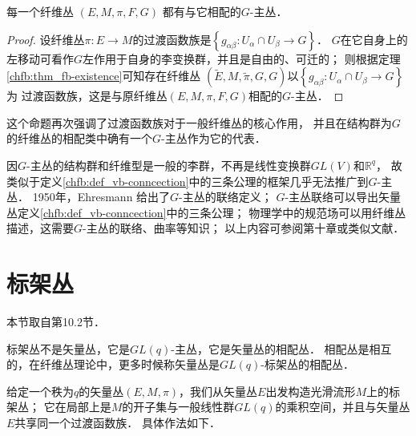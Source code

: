 \begin{proposition}
    每一个纤维丛 $(E, M, \pi, F, G)$ 都有与它相配的$G$-主丛．
\end{proposition} 
\begin{proof}
    设纤维丛$\pi: E \rightarrow M$的过渡函数族是$\left\{g_{\alpha \beta}: U_\alpha \cap U_\beta \rightarrow G\right\}$．
    $G$在它自身上的左移动可看作$G$左作用于自身的李变换群，并且是自由的、可迁的；
    则根据定理\ref{chfb:thm_fb-existence}可知存在纤维丛
    $(\widetilde{E}, M, \tilde{\pi},G, G)$以$\left\{g_{\alpha \beta}: U_\alpha \cap U_\beta \rightarrow G\right\}$为
    过渡函数族，这是与原纤维丛$(E, M, \pi, F, G)$相配的$G$-主丛．
\end{proof}

这个命题再次强调了过渡函数族对于一般纤维丛的核心作用，
并且在结构群为$G$的纤维丛的相配类中确有一个$G$-主丛作为它的代表．


因$G$-主丛的结构群和纤维型是一般的李群，不再是线性变换群$GL(V)$和$\mathbb{R}^q$，
故类似于定义\ref{chfb:def_vb-conncection}中的三条公理的框架几乎无法推广到$G$-主丛．
1950年，Ehresmann 给出了$G$-主丛的联络定义；
$G$-主丛联络可以导出矢量丛定义\ref{chfb:def_vb-conncection}中的三条公理；
物理学中的规范场可以用纤维丛描述，这需要$G$-主丛的联络、曲率等知识；
以上内容可参阅\parencite{chen-li-2004v2}第十章或类似文献．






\section{标架丛}\label{chfb:sec_frame-bundles}

本节取自\parencite{chen-li-2004v2}第10.2节．

标架丛不是矢量丛，它是$GL(q)$-主丛，它是矢量丛的相配丛．
相配丛是相互的，在纤维丛理论中，更多时候称矢量丛是$GL(q)$-标架丛的相配丛．



给定一个秩为$q$的矢量丛$(E,M,\pi)$，我们从矢量丛$E$出发构造光滑流形$M$上的标架丛；
它在局部上是$M$的开子集与一般线性群$GL(q)$的乘积空间，并且与矢量丛$E$共享同一个过渡函数族．
具体作法如下．

